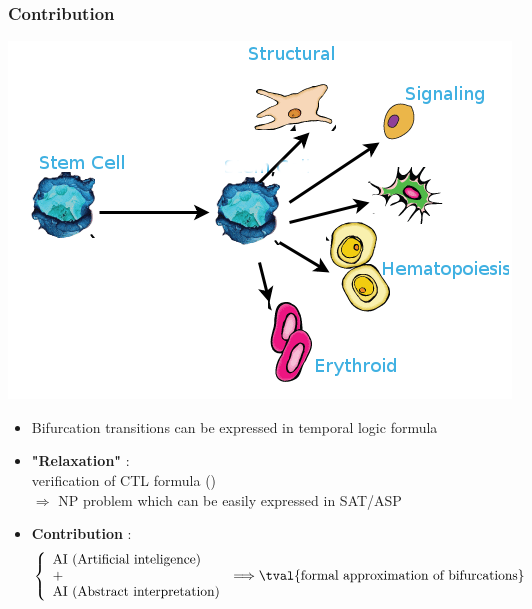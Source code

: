 \begin{frame}[c]
  \frametitle{Contribution}
\begin{center}
  \includegraphics[scale=0.3]{images/illustration_differentiation_newio1.png}
\end{center}


\begin{itemize}
\item Bifurcation transitions can be  expressed in temporal logic formula
\item {\bf "Relaxation"} :\\ verification of CTL formula ()\\
       $\Rightarrow$ NP problem which can be easily expressed in SAT/ASP %
\item {\bf Contribution} : $$
\left\{
    \begin{array}{lcl}
        \mbox{AI (Artificial inteligence)} &\\  %
        \mbox{+} & \Longrightarrow \mbox{\tval{formal approximation of bifurcations}} \\
        \mbox{AI (Abstract interpretation)} &
    \end{array}
\right.
$$ 
\end{itemize}
\end{frame}
